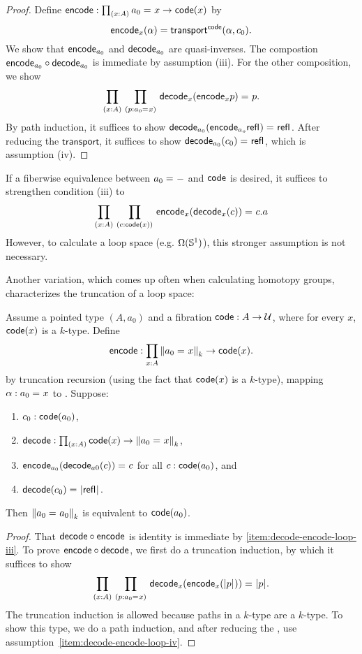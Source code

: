 \begin{proof}
Define
$\encode : \prd{x:A} \id{a_0}{x} \to \code(x)$ by
\[
\encode_x(\alpha) = \transfib{\code}{\alpha}{c_0}.
\]
We show that $\encode_{a_0}$ and $\decode_{a_0}$ are quasi-inverses.  
The compostion $\encode_{a_0} \circ \decode_{a_0}$ is immediate by
assumption (iii).  For the other composition, we show
\[
\prd{x:A}{p : \id{a_0}{x}} \id{\decode_{x} (\encode_{x} p)}{p}.
\] 
By path induction, it suffices to show 
$\id{{\decode_{{a_0}} (\encode_{{a_o}} \refl{})}}{\refl{}}$.
After reducing the $\mathsf{transport}$, it suffices to show 
$\id{{\decode_{{a_0}} (c_0)}}{\refl{}}$, which is assumption (iv).  
\end{proof}

If a fiberwise equivalence between $\id{a_0}{-}$ and $\code$ is desired,
it suffices to strengthen condition (iii) to
\[
\prd{x:A}{c : \code(x)} \id{\encode_{x}(\decode_{x}(c))}{c}.a
\]
However, to calculate a loop space (e.g. $\Omega(\Sn ^1)$), this
stronger assumption is not necessary.  

Another variation, which comes up often when calculating homotopy
groups, characterizes the truncation of a loop space:

\begin{lem}
Assume a pointed type $(A,a_0)$ and a fibration
$\code : A \to \type$, where for every $x$, $\code(x)$ is a $k$-type.
Define 
\[
\encode : \prd{x:A} \trunc{k}{\id{a_0}{x}} \to \code(x).
\]
by truncation recursion (using the fact
that $\code(x)$ is a $k$-type), mapping $\alpha : \id{a_0}{x}$ to 
. Suppose:
\begin{enumerate}
\item $c_0 : \code(a_0)$,
\item $\decode : \prd{x:A} \code(x) \to \trunc{k}{\id{a_0}{x}}$,
\item \label{item:decode-encode-loop-iii}
  $\id{\encode_{a_0}(\decode_{a0}(c))}{c}$ for all $c : \code(a_0)$, and
\item \label{item:decode-encode-loop-iv}
  $\id{\decode(c_0)}{\tproj{}{\refl{}}}$.
\end{enumerate}
Then $\trunc{k}{\id{a_0}{a_0}}$ is equivalent to $\code(a_0)$.
\end{lem}

\begin{proof}
That $\decode \circ \encode$ is identity is immediate by \ref{item:decode-encode-loop-iii}.
%
To prove $\encode \circ \decode$, we first do a truncation induction, by
which it suffices to show
\[
\prd{x:A}{p : \id{a_0}{x}} \id{\decode_{x}(\encode_{x}(\tproj{}{p}))}{\tproj{}{p}}.
\] 
The truncation induction is allowed because paths in a $k$-type are a
$k$-type.  To show this type, we do a path induction, and after reducing
the \encode, use assumption~\ref{item:decode-encode-loop-iv}.
\end{proof}

